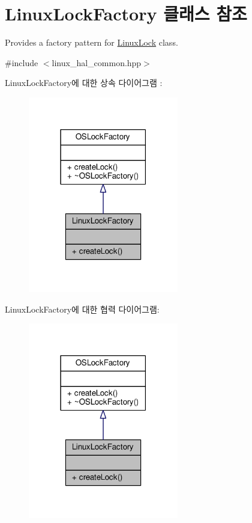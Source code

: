 \hypertarget{class_linux_lock_factory}{}\section{Linux\+Lock\+Factory 클래스 참조}
\label{class_linux_lock_factory}


Provides a factory pattern for \hyperlink{class_linux_lock}{Linux\+Lock} class.  




{\ttfamily \#include $<$linux\+\_\+hal\+\_\+common.\+hpp$>$}



Linux\+Lock\+Factory에 대한 상속 다이어그램 \+: 
\nopagebreak
\begin{figure}[H]
\begin{center}
\leavevmode
\includegraphics[width=186pt]{class_linux_lock_factory__inherit__graph}
\end{center}
\end{figure}


Linux\+Lock\+Factory에 대한 협력 다이어그램\+:
\nopagebreak
\begin{figure}[H]
\begin{center}
\leavevmode
\includegraphics[width=186pt]{class_linux_lock_factory__coll__graph}
\end{center}
\end{figure}
